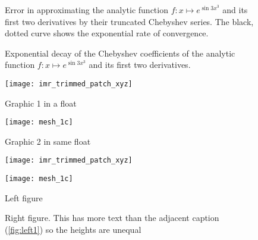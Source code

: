 \begin{figure}
{
  }\hfill\null
  \vspace{\onelineskip}%
  \null\hfill\parbox[t]{0.48\linewidth}{%
  	\caption{Error in approximating the analytic function $f : x \mapsto e^{\sin 3 x^3}$ and its first two derivatives by their truncated Chebyshev series. The black, dotted curve shows the exponential rate of convergence.}\label{fig:convergence_interpolant}%
  }\hfill
  \parbox[t]{0.48\linewidth}{%
    \caption{Exponential decay of the Chebyshev coefficients of the analytic function $f : x \mapsto e^{\sin 3 x^3}$ and its first two derivatives.}%
  	\label{fig:convergence_coeffs}%
  }\hfill\null
\end{figure}

\lipsum[8-9]



\begin{figure}
  \centering
  \begin{minipage}{0.4\textwidth}
    \centering
    \texttt{[image: imr\_trimmed\_patch\_xyz]}
    \caption{Graphic 1 in a float} \label{fig:mult2}
  \end{minipage}
  \hfill
  \begin{minipage}{0.4\textwidth}
    \centering
    \texttt{[image: mesh\_1c]}
    \caption{Graphic 2 in same float} \label{fig:mult3}
  \end{minipage}
\end{figure}

\lipsum[8-15]

\begin{figure}
  \vspace{\onelineskip}
  \null\hfill\parbox{0.48\linewidth}{%
    \centering
    \texttt{[image: imr\_trimmed\_patch\_xyz]}
  }\hfill
  \parbox{0.48\linewidth}{%
    \centering
	\texttt{[image: mesh\_1c]}
  }\hfill\null
  \vspace{\onelineskip}%
  \null\hfill\parbox[t]{0.48\linewidth}{%
  	\caption{Left figure}\label{fig:left1}%
  }\hfill
  \parbox[t]{0.48\linewidth}{%
    \caption{Right figure. This has more text than the adjacent
    caption (\ref{fig:left1}) so the heights are unequal}%
  	\label{fig:right1}%
  }\hfill\null
\end{figure}




